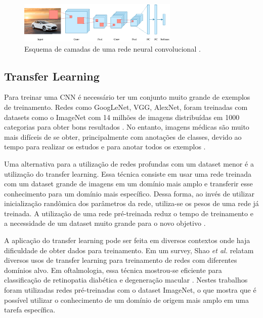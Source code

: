 \documentclass[conference]{IEEEtran}
\begin{document}

\begin{figure}[!tp]
 \centering
 \includegraphics[width=3in]{img/convolucao.png}
 \caption{Esquema de camadas de uma rede neural convolucional \cite{convTDS}.}
 \label{fig:convolucao}
\end{figure}


  \subsection{Transfer Learning}


  Para treinar uma CNN é necessário ter um conjunto muito grande de exemplos de treinamento. Redes como GoogLeNet, VGG, AlexNet, foram treinadas com datasets como o ImageNet com 14 milhões de imagens distribuídas em 1000 categorias para obter bons resultados \cite{ILSVRC15}. No entanto, imagens médicas são muito mais difíceis de se obter, principalmente com anotações de classes, devido ao tempo para realizar os estudos e para anotar todos os exemplos \cite{greenspan2016}.
  
  Uma alternativa para a utilização de redes profundas com um dataset menor é a utilização do transfer learning. Essa técnica consiste em usar uma rede treinada com um dataset grande de imagens em um domínio mais amplo e transferir esse conhecimento para um domínio mais específico. Dessa forma, ao invés de utilizar inicialização randômica dos parâmetros da rede, utiliza-se os pesos de uma rede já treinada. A utilização de uma rede pré-treinada reduz o tempo de treinamento e a necessidade de um dataset muito grande para o novo objetivo \cite{tan2018}.

  A aplicação do transfer learning pode ser feita em diversos contextos onde haja dificuldade de obter dados para treinamento. Em um survey, Shao \textit{et al.} \cite{shao2015} relatam diversos usos de transfer learning para treinamento de redes com diferentes domínios alvo. Em oftalmologia, essa técnica mostrou-se eficiente para classificação de retinopatia diabética \cite{li2017} e degeneração macular \cite{lee2017}. Nestes trabalhos foram utilizadas redes pré-treinadas com o dataset ImageNet, o que mostra que é possível utilizar o conhecimento de um domínio de origem mais amplo em uma tarefa específica. 
\end{document}
